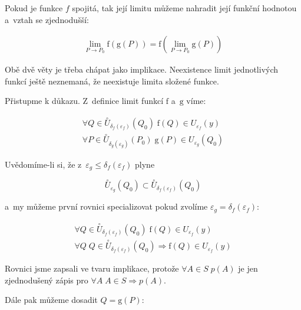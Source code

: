 Pokud je funkce \(f\) spojitá, tak její limitu můžeme nahradit její funkční hodnotou a~vztah se zjednodušší:

\begin{equation}
\label{eq:limita_spojite_slozene_funkce}
\begin{split}
\lim_{P \to P_0} \mathrm{f}(\mathrm{g}(P)) = \mathrm{f} \left( \lim_{P \to P_0} \mathrm{g}(P) \right)
\end{split}
\end{equation}

Obě dvě věty je třeba chápat jako implikace. Neexistence limit jednotlivých funkcí ještě neznemaná, že neexistuje limita složené funkce.

Přistupme k důkazu. Z~definice limit funkcí \(\mathrm{f}\) a~\(\mathrm{g}\) víme:

\begin{equation}
\begin{split}
\forall Q \in \overset{\circ}{U}_{\delta_f(\varepsilon_f)}(Q_0) \; \mathrm{f}(Q) \in U_{\varepsilon_f}(y) \\
\forall P \in \overset{\circ}{U}_{\delta_g(\varepsilon_g)}(P_0) \; \mathrm{g}(P) \in U_{\varepsilon_g}(Q_0)
\end{split}
\end{equation}

Uvědomíme-li si, že z~\(\varepsilon_g \leq \delta_f(\varepsilon_f)\) plyne

\begin{equation}
\overset{\circ}{U}_{\varepsilon_g}(Q_0) \subset \overset{\circ}{U}_{\delta_f(\varepsilon_f)}(Q_0)
\end{equation}

a~my můžeme první rovnici specializovat pokud zvolíme \(\varepsilon_g = \delta_f(\varepsilon_f)\):

\begin{equation}
\begin{split}
\forall Q \in \overset{\circ}{U}_{\delta_f(\varepsilon_f)}(Q_0) \; \mathrm{f}(Q) \in U_{\varepsilon_f}(y) \\
\forall Q \; Q \in \overset{\circ}{U}_{\delta_f(\varepsilon_f)}(Q_0) \Rightarrow \mathrm{f}(Q) \in U_{\varepsilon_f}(y)
\end{split}
\end{equation}

Rovnici jsme zapsali ve tvaru implikace, protože \(\forall A \in S \; p(A)\) je jen zjednodušený zápis pro \(\forall A \; A \in S \Rightarrow p(A)\). 

Dále pak můžeme dosadit \(Q = \mathrm{g}(P)\):

